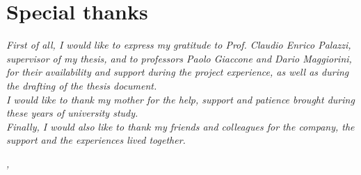 
\cleardoublepage
{}
{}

\bigskip

\begingroup
\let\clearpage\relax
\let\cleardoublepage\relax
\let\cleardoublepage\relax

\chapter*{Special thanks}

\noindent \textit{First of all, I would like to express my gratitude to Prof. Claudio Enrico Palazzi, supervisor of my thesis, and to professors Paolo Giaccone and Dario Maggiorini, for their availability and support during the project experience, as well as during the drafting of the thesis document.}\\

\noindent \textit{I would like to thank my mother for the help, support and patience brought during these years of university study.}\\

\noindent \textit{Finally, I would also like to thank my friends and colleagues for the company, the support and the experiences lived together.}\\
\bigskip

\noindent\textit{\myLocation, \myTime}
\hfill \myName

\endgroup

